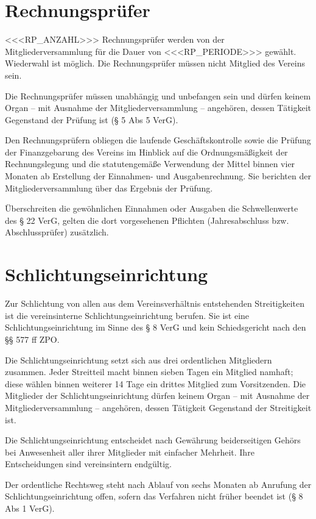 \documentclass[a4paper,11pt]{article}
\begin{document}
\section{Rechnungsprüfer}\label{par:rp}
\begin{absaetze}
  \item <<<RP_ANZAHL>>> Rechnungsprüfer werden von der Mitgliederversammlung für die Dauer von <<<RP_PERIODE>>>
        gewählt. Wiederwahl ist möglich. Die Rechnungsprüfer müssen nicht Mitglied des Vereins sein.
  \item Die Rechnungsprüfer müssen unabhängig und unbefangen sein und dürfen keinem Organ – mit Ausnahme der
        Mitgliederversammlung – angehören, dessen Tätigkeit Gegenstand der Prüfung ist (§ 5 Abs 5 VerG).
  \item Den Rechnungsprüfern obliegen die laufende Geschäftskontrolle sowie die Prüfung der Finanzgebarung des Vereins
        im Hinblick auf die Ordnungsmäßigkeit der Rechnungslegung und die statutengemäße Verwendung der Mittel binnen
        vier Monaten ab Erstellung der Einnahmen- und Ausgabenrechnung. Sie berichten der Mitgliederversammlung über
        das Ergebnis der Prüfung.
  \item Überschreiten die gewöhnlichen Einnahmen oder Ausgaben die Schwellenwerte des § 22 VerG, gelten die dort
        vorgesehenen Pflichten (Jahresabschluss bzw. Abschlussprüfer) zusätzlich.
\end{absaetze}

\section{Schlichtungseinrichtung}\label{par:schlichtung}
\begin{absaetze}
  \item Zur Schlichtung von allen aus dem Vereinsverhältnis entstehenden Streitigkeiten ist die vereinsinterne
        Schlichtungseinrichtung berufen. Sie ist eine \glqq{}Schlichtungseinrichtung\grqq{} im Sinne des § 8 VerG und kein
        Schiedsgericht nach den §§ 577 ff ZPO.
  \item Die Schlichtungseinrichtung setzt sich aus drei ordentlichen Mitgliedern zusammen. Jeder Streitteil macht
        binnen sieben Tagen ein Mitglied namhaft; diese wählen binnen weiterer 14 Tage ein drittes Mitglied zum
        Vorsitzenden. Die Mitglieder der Schlichtungseinrichtung dürfen keinem Organ – mit Ausnahme der
        Mitgliederversammlung – angehören, dessen Tätigkeit Gegenstand der Streitigkeit ist.
  \item Die Schlichtungseinrichtung entscheidet nach Gewährung beiderseitigen Gehörs bei Anwesenheit aller ihrer
        Mitglieder mit einfacher Mehrheit. Ihre Entscheidungen sind vereinsintern endgültig.
  \item Der ordentliche Rechtsweg steht nach Ablauf von sechs Monaten ab Anrufung der Schlichtungseinrichtung offen,
        sofern das Verfahren nicht früher beendet ist (§ 8 Abs 1 VerG).
\end{absaetze}
\end{document}

